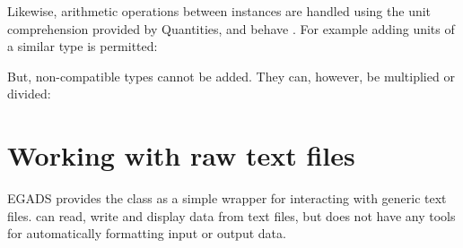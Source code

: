 \documentclass[a4paper,10pt,openany,english]{sphinxmanual}
\begin{document}
Likewise, arithmetic operations between {\hyperref[egadsapi:egads.core.egads_core.EgadsData]{}} instances are handled using the unit comprehension provided by Quantities, and behave . For example adding units of a similar type is permitted:

\begin{sphinxVerbatim}[commandchars=\\\{\}]
   
   
  
\end{sphinxVerbatim}

But, non-compatible types cannot be added. They can, however, be multiplied or divided:

\begin{sphinxVerbatim}[commandchars=\\\{\}]
   
   
  
\end{sphinxVerbatim}
\newpage

\section{Working with raw text files}
\label{tutorial:working-with-raw-text-files}
EGADS provides the {\hyperref[egadsapi:egads.input.text_file_io.EgadsFile]{}} class as a simple wrapper for interacting with generic text files. {\hyperref[egadsapi:egads.input.text_file_io.EgadsFile]{}} can read, write and display data from text files, but does not have any tools for automatically formatting input or output data.
\end{document}
